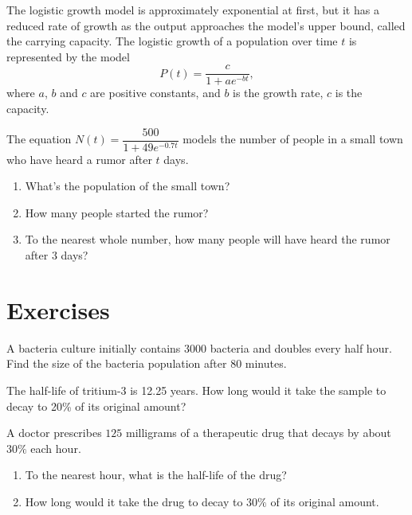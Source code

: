 \newpage
\begin{howto}
  The logistic growth model is approximately exponential at first, but it has a reduced rate of growth as the output approaches the model's upper bound, called the carrying capacity. The logistic growth of a population over time $t$ is represented by the model
  \[P(t)=\dfrac{c}{1+ae^{-bt}},\]
  where $a$, $b$ and $c$ are positive constants, and $b$ is the growth rate, $c$ is the capacity.
\end{howto}

\begin{example}
  The equation  $N(t)=\dfrac{500}{1+49e^{-0.7t}}$ models the number of people in a small town who have heard a rumor after $t$ days.
  \begin{enumerate}
    \item What's the population of the small town?
    \item How many people started the rumor?
    \item To the nearest whole number, how many people will have heard the rumor after $3$ days?
  \end{enumerate}
\end{example}

\newpage

\section*{Exercises}

\begin{exercise}
  A bacteria culture initially contains $3000$ bacteria and doubles every half hour. Find the size of the bacteria population after $80$ minutes.
\end{exercise}

\begin{exercise}
  The half-life of tritium-3 is 12.25 years. How long would it take the sample to decay to 20\% of its original amount?
\end{exercise}

\begin{exercise}
  A doctor prescribes $125$ milligrams of a therapeutic drug that decays by about $30\%$ each hour.
  \begin{enumerate}
    \item To the nearest hour, what is the half-life of the drug?
    \item How long would it take the drug to decay to $30\%$ of its original amount.
  \end{enumerate}
\end{exercise}


